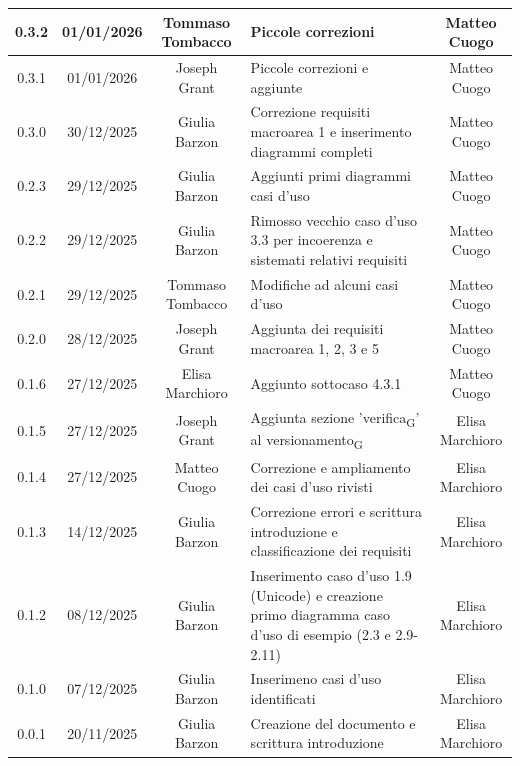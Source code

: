 \documentclass[11pt,a4paper]{article}
\newcommand{\gls}[1]{#1\textsubscript{G}}
\begin{document}
\begin{longtable}[H]{|c|c|c|>{\raggedright\arraybackslash}p{}|c|}
        \hline
        0.3.2 & 01/01/2026 & Tommaso Tombacco & Piccole correzioni & Matteo Cuogo\\
        \hline
        0.3.1 & 01/01/2026 & Joseph Grant & Piccole correzioni e aggiunte &  Matteo Cuogo\\
        \hline
        0.3.0 & 30/12/2025 & Giulia Barzon & Correzione requisiti macroarea 1 e inserimento diagrammi completi & Matteo Cuogo \\
        \hline
        0.2.3 & 29/12/2025 & Giulia Barzon & Aggiunti primi diagrammi casi d'uso &  Matteo Cuogo \\
        \hline
        0.2.2 & 29/12/2025 & Giulia Barzon & Rimosso vecchio caso d'uso 3.3 per incoerenza e sistemati relativi requisiti & Matteo Cuogo \\
        \hline
        0.2.1 & 29/12/2025 & Tommaso Tombacco & Modifiche ad alcuni casi d'uso &  Matteo Cuogo\\ 
        \hline
        0.2.0 & 28/12/2025 & Joseph Grant & Aggiunta dei requisiti macroarea 1, 2, 3 e 5 &  Matteo Cuogo\\ 
        \hline
        0.1.6 & 27/12/2025 & Elisa Marchioro & Aggiunto sottocaso 4.3.1 & Matteo Cuogo\\ 
        \hline
        0.1.5 & 27/12/2025 & Joseph Grant & Aggiunta sezione '\gls{verifica}' al \gls{versionamento} & Elisa Marchioro\\ 
        \hline
        0.1.4 & 27/12/2025 & Matteo Cuogo & Correzione e ampliamento dei casi d'uso rivisti & Elisa Marchioro\\
        \hline
        0.1.3 & 14/12/2025 & Giulia Barzon & Correzione errori e scrittura introduzione e classificazione dei requisiti & Elisa Marchioro\\
        \hline
        0.1.2 & 08/12/2025 & Giulia Barzon & Inserimento caso d'uso 1.9 (Unicode) e creazione primo diagramma caso d'uso di esempio (2.3 e 2.9-2.11) & Elisa Marchioro\\
        \hline
        0.1.0 & 07/12/2025 & Giulia Barzon & Inserimeno casi d'uso identificati & Elisa Marchioro\\
        \hline
        0.0.1 & 20/11/2025 & Giulia Barzon & Creazione del documento e scrittura introduzione & Elisa Marchioro\\
        \hline
\end{longtable}

\newpage

\tableofcontents
\thispagestyle{empty}
\newpage
\end{document}
